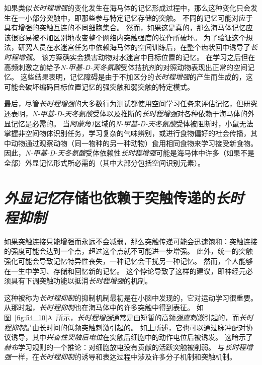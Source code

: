 如果类似\textit{长时程增强}的变化发生在海马体的记忆形成过程中，那么这种变化只会发生在一小部分突触中，即那些参与特定记忆存储的突触。
不同的记忆可能对应于具有增强的突触互连的不同细胞集合。
然而，如果这是真的，那么海马体记忆应该很容易被不加区别地改变整个网络内突触强度的操作所破坏。
为了验证这个想法，研究人员在水迷宫任务中依赖海马体的空间训练后，在整个齿状回中诱导了\textit{长时程增强}。
该方案确实会损害动物对水迷宫中目标位置的记忆。
在学习之后但在高频刺激之前给予\textit{N-甲基-D-天冬氨酸}受体拮抗剂的对照动物表现出正常的空间记忆。
这些结果表明，记忆障碍是由于不加区分的\textit{长时程增强}的产生而生成的，这可能会破坏编码目标位置记忆的强突触和弱突触的特定模式。


最后，尽管\textit{长时程增强}的大多数行为测试都使用空间学习任务来评估记忆，但研究还表明，\textit{N-甲基-D-天冬氨酸}受体以及推断的\textit{长时程增强}对各种依赖于海马体的外显记忆是必需的。
当\textit{阿蒙角1}区域的\textit{N-甲基-D-天冬氨酸}受体被阻断时，小鼠无法掌握非空间物体识别任务，学习复杂的气味辨别，或进行食物偏好的社会传播，其中动物通过观察动物（同一物种的另一种动物）食用相同食物来学习接受新食物。
因此，\textit{N-甲基-D-天冬氨酸}受体依赖性\textit{长时程增强}可能是海马体中许多（如果不是全部）外显记忆形式所必需的（其中大部分包括空间识别元素）。



\section{\textit{外显记忆}存储也依赖于突触传递的\textit{长时程抑制}}

如果突触连接只能增强而永远不会减弱，那么突触传递可能会迅速饱和：突触连接的强度可能会达到一个点，超过这个点就不可能进一步增强。
此外，统一的突触强化可能会导致记忆特异性丧失，一种记忆会干扰另一种记忆。
然而，个人能够在一生中学习、存储和回忆新的记忆。
这个悖论导致了这样的建议，即神经元必须具有下调突触功能以抵消\textit{长时程增强}的机制。


这种被称为\textit{长时程抑制}的抑制机制最初是在小脑中发现的，它对运动学习很重要。
从那时起，\textit{长时程抑制}也在海马体中的许多突触中得到表征。
如图~\ref{fig:54_10}A~所示，\textit{长时程增强}通常是由短暂的高频\textit{强直刺激}引起的，而\textit{长时程抑制}是由长时间的低频突触刺激引起的。
如上所述，它也可以通过脉冲配对协议诱导，其中\textit{兴奋性突触后电位}在突触后细胞中的动作电位后被诱发。
这暗示了\textit{赫布}学习规则的一个推论：对细胞放电没有贡献的活跃突触被削弱。
与\textit{长时程增强}一样，在\textit{长时程抑制}的诱导和表达过程中涉及许多分子机制和突触机制。


